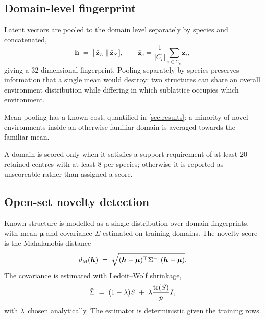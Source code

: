 \subsection{Domain-level fingerprint}
\label{sec:fingerprint}

Latent vectors are pooled to the domain level separately by species and concatenated,
\begin{equation}
  \bm{h} \;=\; \bigl[\, \bar{\bm{z}}_{L} \;\Vert\; \bar{\bm{z}}_{S} \,\bigr],
  \qquad
  \bar{\bm{z}}_{c} = \frac{1}{|C_c|}\sum_{i \in C_c} \bm{z}_i ,
  \label{eq:fingerprint}
\end{equation}
giving a $32$-dimensional fingerprint. Pooling separately by species preserves information
that a single mean would destroy: two structures can share an overall environment
distribution while differing in which sublattice occupies which environment.

Mean pooling has a known cost, quantified in \cref{sec:results}: a minority of novel
environments inside an otherwise familiar domain is averaged towards the familiar mean.

A domain is scored only when it satisfies a support requirement of at least $20$ retained
centres with at least $8$ per species; otherwise it is reported as unscoreable rather than
assigned a score.

\subsection{Open-set novelty detection}
\label{sec:ood}

Known structure is modelled as a single distribution over domain fingerprints, with mean
$\bm{\mu}$ and covariance $\Sigma$ estimated on training domains. The novelty score is the
Mahalanobis distance
\begin{equation}
  d_{\mathrm{M}}(\bm{h}) \;=\; \sqrt{ (\bm{h}-\bm{\mu})^{\top} \Sigma^{-1} (\bm{h}-\bm{\mu}) } .
  \label{eq:mahalanobis}
\end{equation}
The covariance is estimated with Ledoit--Wolf shrinkage,
\begin{equation}
  \hat{\Sigma} \;=\; (1-\lambda) S \;+\; \lambda \frac{\operatorname{tr}(S)}{p} I ,
  \label{eq:ledoitwolf}
\end{equation}
with $\lambda$ chosen analytically. The estimator is deterministic given the training rows.

